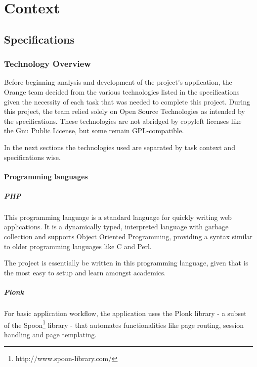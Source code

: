 \chapter{Context} \label{ch:context}

\section{Specifications} \label{sec:specs}

\subsection{Technology Overview}

Before beginning analysis and development of the project's application, the
Orange team decided from the various technologies  listed in the specifications
given the necessity of each task that was needed to complete this project.
During this project, the team relied solely on Open Source Technologies as
intended by the specifications. These technologies are not abridged by copyleft
licenses like the Gnu Public License, but some remain GPL-compatible.

In the next sections the technologies used are separated by task context and 
specifications wise.

\subsubsection{Programming languages}

\paragraph{PHP}

This programming language is a standard language for quickly writing web
applications.  It is a dynamically typed, interpreted language with garbage
collection and supports Object Oriented Programming, providing a syntax similar
to older programming languages like C and Perl.

The project is essentially be written in this programming language, given that
is the most easy to setup and learn amongst academics.

\paragraph{Plonk}

For basic application workflow, the application uses the Plonk library - a
subset of the Spoon\footnote{http://www.spoon-library.com/} library - that
automates functionalities like page routing, session handling and page
templating.

